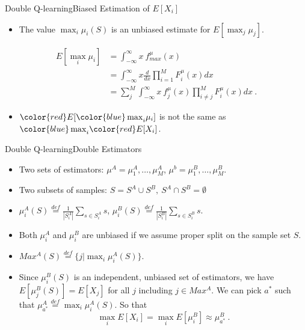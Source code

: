 \documentclass{beamer}
\newcommand{\red}[1]{{\color{red} #1}}
\newcommand{\blue}[1]{{\color{blue} #1}}
\begin{document}
\begin{frame}{Double Q-learning}{Biased Estimation of $E[X_i]$}
	\begin{itemize}
		\item The value $\max_i \mu_i(S)$ is an unbiased estimate for $E[\max_j \mu_j]$.
	\end{itemize}
	\begin{equation}\label{eq:single_est}
	\begin{aligned}
		E[\max_i \mu_i] &= \int_{-\infty}^{\infty} x ~f_{max}^{\mu}(x) \\
		&= \int_{-\infty}^{\infty}x\frac{d}{dx}\prod_{i=1}^M F_i^{\mu}(x)dx \\
		&= \sum_j^M \int_{-\infty}^{\infty}x ~f_j^{\mu}(x) \prod_{i\neq j}^M F_i^{\mu}(x)dx ~.
	\end{aligned}
	\end{equation}
	\begin{itemize}
		\item $\red{E}[\blue{\max}_i \mu_i]$ is not the same as $\blue{\max}_i \red{E}[X_i]$.
	\end{itemize}
\end{frame}

\begin{frame}{Double Q-learning}{Double Estimators}
	\begin{itemize}
		\item Two sets of estimators: $\mu^A={\mu_1^A,\ldots,\mu_M^A}$, $\mu^b={\mu_1^B,\ldots,\mu_M^B}$.
		\item Two subsets of samples: $S=S^A\cup S^B,~S^A \cap S^B = \emptyset$
		\item $\mu_i^A(S) \overset{def}{=}\frac{1}{|S^A_i|}\sum_{s\in S^A_i}s$, $\mu_i^B(S) \overset{def}{=}\frac{1}{|S^B_i|}\sum_{s\in S^B_i}s$.
	\end{itemize}

	\begin{itemize}
		\item Both $\mu_i^A$ and $\mu_i^B$ are unbiased if we assume proper split on the sample set $S$.
		\item $Max^A(S) \overset{def}{=} \{ j | \max_i \mu_i^A(S)\}$.
		\item Since $\mu_i^B(S)$ is an independent, unbiased set of estimators, we have $E[\mu_j^B(S)] = E[X_j]$ for all $j$ including $j \in Max^A$. We can pick $a^*$ such that $\mu_{a^*}^A \overset{def}{=} \max_i \mu_i^A(S)$. So that
		\begin{equation}
			\max_i E[X_i] = \max_i E[\mu_i^B] \approx \mu_{a^*}^B ~.
		\end{equation}
	\end{itemize}
\end{frame}
\end{document}
